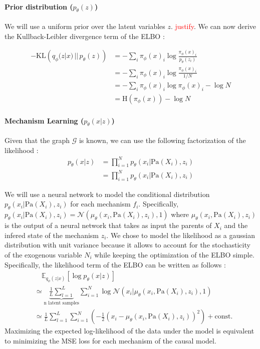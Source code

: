 \documentclass{article}
\newcommand\todo[1]{\textcolor{red}{#1}}
\begin{document}
\paragraph{Prior distribution ($p_\theta(z)$)} We will use a uniform prior over the latent variables $z$. \todo{justify}. We can now derive the Kullback-Leibler divergence term of the ELBO :

\begin{align*}
    -\text{KL}\left(q_\phi(z | x) \,||\, p_\theta(z)\right)
    &= - \sum_{i} \pi_\phi(x)_i \log \frac{\pi_\phi(x)_i}{p_\theta(z_i)} \\
    &= - \sum_{i} \pi_\phi(x)_i \log \frac{\pi_\phi(x)_i}{1/N} \\
    &= - \sum_{i} \pi_\phi(x)_i \log \pi_\phi(x)_i - \log N \\
    &= \text{H}(\pi_\phi(x)) - \log N
\end{align*}

\paragraph{Mechanism Learning ($p_\theta(x | z)$)}

Given that the graph $\mathcal{G}$ is known, we can use the following factorization of the likelihood :
\begin{align*}
    p_\theta(x | z) &= \prod_{i = 1}^N p_\theta(x_i | \text{Pa}(X_i), z_i) \\
    &= \prod_{i = 1}^N p_\theta(x_i | \text{Pa}(X_i), z_i)
\end{align*}

We will use a neural network to model the conditional distribution $p_\theta(x_i | \text{Pa}(X_i), z_i)$ for each mechanism $f_i$. Specifically, $p_\theta(x_i | \text{Pa}(X_i), z_i) = \mathcal{N}(\mu_\theta(x_i, \text{Pa}(X_i), z_i), 1)$ where $\mu_\theta(x_i, \text{Pa}(X_i), z_i)$ is the output of a neural network that takes as input the parents of $X_i$ and the infered state of the mechanism $z_i$. We chose to model the likelihood as a gaussian distribution with unit variance because it allows to account for the stochasticity of the exogenous variable $N_i$ while keeping the optimization of the ELBO simple. Specifically, the likelihood term of the ELBO can be written as follows :
\begin{align*}
    & \quad \mathbb{E}_{q_\phi(z | x)} \left[ \log p_\theta(x | z) \right] \\ &\simeq \underbrace{\frac{1}{L} \sum_{l = 1}^L }_{\text{n latent samples}} \sum_{i = 1}^N \log \mathcal{N}(x_i | \mu_\theta(x_i, \text{Pa}(X_i), z_i), 1)\\
    &\simeq \frac{1}{L} \sum_{l = 1}^L \sum_{i = 1}^N \left( -\frac{1}{2} \left( x_i - \mu_\theta(x_i, \text{Pa}(X_i), z_i) \right)^2 \right) + \text{const.}
\end{align*}
Maximizing the expected log-likelihood of the data under the model is equivalent to minimizing the MSE loss for each mechanism of the causal model.
\end{document}
